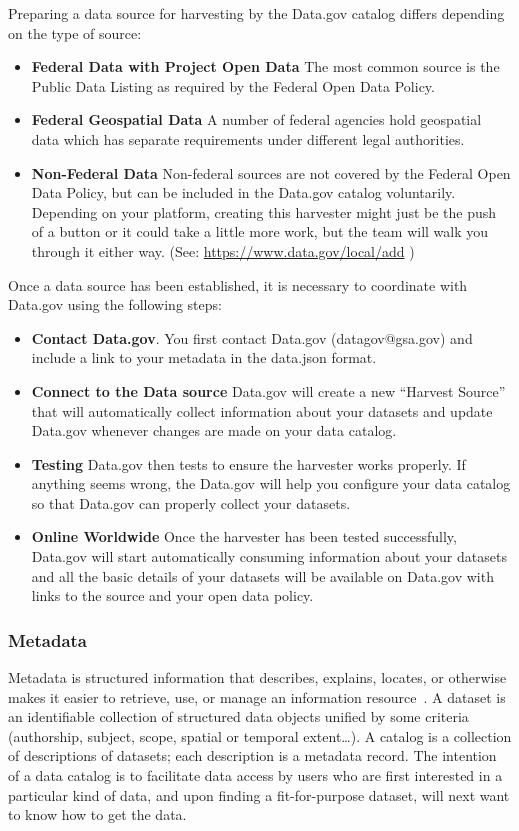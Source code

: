 Preparing a data source for harvesting by the Data.gov catalog differs depending on the type of source:
\begin{itemize}
    \item 
\textbf{ Federal Data with Project Open Data} The most common source is the Public Data Listing as required by the Federal Open Data Policy.
\item
\textbf{ Federal Geospatial Data} A number of federal agencies hold geospatial data which has separate requirements under different legal authorities.
\item
\textbf{ Non-Federal Data} Non-federal sources are not covered by the Federal Open Data Policy, but can be included in the Data.gov catalog voluntarily. Depending on your platform, creating this harvester might just be the push of a button or it could take a little more work, but the team will walk you through it either way. (See: \url{https://www.data.gov/local/add} )
\end{itemize}
Once a data source has been established, it is necessary to coordinate with Data.gov using the following steps:
\begin{itemize}
    \item \textbf{ Contact Data.gov}. You first contact Data.gov  (datagov@gsa.gov) and include a link to your metadata in the data.json format.

\item \textbf{Connect to the Data source}  Data.gov will create a new ``Harvest Source'' that will automatically collect information about your datasets and update Data.gov whenever changes are made on your data catalog.

\item \textbf{Testing}  Data.gov then tests to ensure the harvester works properly. If anything seems wrong, the Data.gov will help you configure your data catalog so that Data.gov can properly collect your datasets.

\item \textbf{Online Worldwide} Once the harvester has been tested successfully, Data.gov will start automatically consuming information about your datasets and all the basic details of your datasets will be available on Data.gov with links to the source and your open data policy.
\end{itemize}





\subsubsection{Metadata}
Metadata is structured information that describes, explains, locates, or otherwise makes it easier to retrieve, use, or manage an information resource~\cite{press2004understanding}.  A dataset is an identifiable collection of structured data objects unified by some criteria (authorship, subject, scope, spatial or temporal extent…). A catalog is a collection of descriptions of datasets; each description is a metadata record. The intention of a data catalog is to facilitate data access by users who are first interested in a particular kind of data, and upon finding a fit-for-purpose dataset, will next want to know how to get the data.



